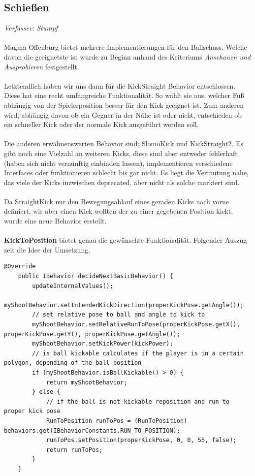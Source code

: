 \documentclass[fontsize=12pt,a4paper,final]{scrartcl}[2003/01/01]
\begin{document}
\subsection{Schie{\ss}en}\label{sse:Elem Bew:Schiessen}
\textit{Verfasser: Stumpf}\\
\\
Magma Offenburg bietet mehrere Implementierungen für den Ballschuss. Welche davon die geeignetste ist wurde zu Beginn anhand des Kriteriums \textit{\glqq Anschauen und Ausprobieren\grqq} festgestellt.\\
\\
Letztendlich haben wir uns dann für die KickStraight Behavior entschlossen. Diese hat eine recht umfangreiche Funktionalität. So wählt sie aus, welcher Fuß abhängig von der Spielerposition besser für den Kick geeignet ist. Zum anderen wird, abhängig davon ob ein Gegner in der Nähe ist oder nicht, entschieden ob ein schneller Kick oder der normale Kick ausgeführt werden soll.\\
\\
Die anderen erwähnenswerten Behavior sind: SlomoKick und KickStraight2. Es gibt noch eine Vielzahl an weiteren Kicks, diese sind aber entweder fehlerhaft (haben sich nicht vernünftig einbinden lassen), implementieren verschiedene Interfaces oder funktionieren schlecht bis gar nicht. Es liegt die Vermutung nahe, das viele der Kicks inzwischen deprecated, aber nicht als solche markiert sind.\\
\\
Da StraightKick nur den Bewegungsablauf eines geraden Kicks nach vorne definiert, wir aber einen Kick wollten der zu einer gegebenen Position kickt, wurde eine neue Behavior erstellt.\\
\\
\textbf{KickToPosition} bietet genau die gewünschte Funktionalität. Folgender Auszug zeit die Idee der Umsetzung.

\begin{lstlisting}[caption=KickToPosition, captionpos=b, label=lst:KickToPosition]
 @Override
    public IBehavior decideNextBasicBehavior() {
        updateInternalValues();
        myShootBehavior.setIntendedKickDirection(properKickPose.getAngle());
        // set relative pose to ball and angle to kick to
        myShootBehavior.setRelativeRunToPose(properKickPose.getX(), properKickPose.getY(), properKickPose.getAngle());
        myShootBehavior.setKickPower(kickPower);
        // is ball kickable calculates if the player is in a certain polygon, depending of the ball position
        if (myShootBehavior.isBallKickable() > 0) {
            return myShootBehavior;
        } else {
            // if the ball is not kickable reposition and run to proper kick pose
            RunToPosition runToPos = (RunToPosition) behaviors.get(IBehaviorConstants.RUN_TO_POSITION);
            runToPos.setPosition(properKickPose, 0, 0, 55, false);
            return runToPos;
        }
    }
\end{lstlisting}
\end{document}
